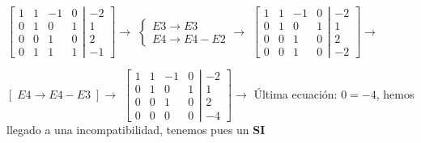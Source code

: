 \begin{proofw}
\noindent $\left[ \begin{matrix}
 1 & 1 & -1 & 0\\ 0 & 1 & 0 & 1 \\ 0 & 0 & 1 & 0 \\ 0 & 1 & 1 & 1 
 \end{matrix}\right. 
 \left| \begin{matrix}
  -2 \\ 1 \\ 2  \\ -1
 \end{matrix}\right] \to$ \textcolor{gris}{$\begin{cases} E3 \to E3 \\ E4 \to E4-E2 \end{cases} \to $}
 $\left[ \begin{matrix}
 1 & 1 & -1 & 0\\ 0 & 1 & 0 & 1 \\ 0 & 0 & 1 & 0 \\ 0 & 0 & 1 & 0 
 \end{matrix}\right. 
 \left| \begin{matrix}
  -2 \\ 1 \\ 2  \\ -2
 \end{matrix}\right] \to$
 


\noindent  \textcolor{gris}{$[\;E4 \to E4-E3 \;] \to $} $\left[ \begin{matrix}
 1 & 1 & -1 & 0\\ 0 & 1 & 0 & 1 \\ 0 & 0 & 1 & 0 \\ 0 & 0 & 0 & 0 
 \end{matrix}\right. 
 \left| \begin{matrix}
  -2 \\ 1 \\ 2  \\ -4
 \end{matrix}\right] \to$ Última ecuación: $0=-4$, hemos llegado a una incompatibilidad, tenemos pues un \textbf{SI}
\end{proofw}

